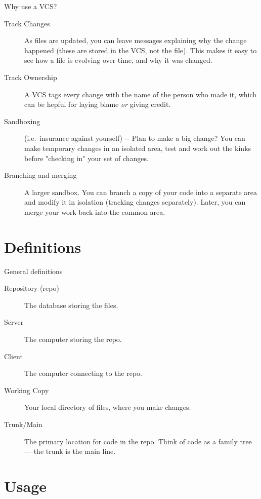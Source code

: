 \documentclass[aspectratio=169]{beamer}
\begin{document}
\begin{frame}{Why use a VCS?}

\begin{description}
\item[Track Changes] As files are updated, you can leave messages
  explaining why the change happened (these are stored in the VCS, not
  the file). This makes it easy to see how a file is evolving over time,
  and why it was changed.
\item[Track Ownership] A VCS tags every change with the name of
  the person who made it, which can be hepful for laying blame \emph{or}
  giving credit.
\item[Sandboxing] (i.e.~insurance against yourself) -\/- Plan to make
  a big change? You can make temporary changes in an isolated area, test
  and work out the kinks before "checking in" your set of changes.
\item[Branching and merging] A larger sandbox. You can branch a
  copy of your code into a separate area and modify it in isolation
  (tracking changes separately). Later, you can merge your work back
  into the common area.
\end{description}
\end{frame}

\section{Definitions}

\begin{frame}{General definitions}

\begin{description}
\item[Repository (repo)] The database storing the files.
\item[Server] The computer storing the repo.
\item[Client] The computer connecting to the repo.
\item[Working Copy] Your local directory of files,
  where you make changes.
\item[Trunk/Main] The primary location for code in the repo.
  Think of code as a family tree --- the trunk is the main line.
\end{description}

\end{frame}

\section{Usage}
\end{document}
